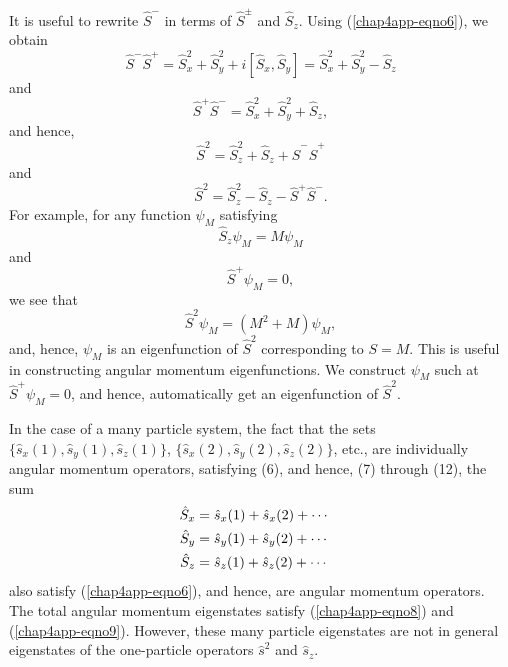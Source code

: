 {It is useful to rewrite ${\hat S}^-$ in terms of ${\hat S}^{\pm}$ and 
${\hat S}_z$. Using (\ref{chap4app-eqno6}), we obtain
\begin{equation}
{\hat S}^- {\hat S}^+ = {\hat S}^2_x + {\hat S}^2_y + i \left[ {\hat S}_x , 
{\hat S}_y \right] = {\hat S}^2_x + {\hat S}^2_y - {\hat S}_z
\end{equation}
and
\begin{equation}
{\hat S}^+ {\hat S}^- = {\hat S}^2_x + {\hat S}^2_y + {\hat S}_z ,
\end{equation}
and hence,
\begin{equation}
{\hat S}^2 = {\hat S}^2_z + {\hat S}_z + {\hat S}^- {\hat S}^+
\label{chap4app-eqno12a}
\end{equation}
and
\begin{equation}
{\hat S}^2 = {\hat S}^2_z - {\hat S}_z - {\hat S}^+ {\hat S}^- 
.
\label{chap4app-eqno12b}
\end{equation}
For example, for any function $\psi_M$ satisfying
\begin{equation}
{\hat S}_z \psi_M = M \psi_M
\end{equation}
and
\begin{equation}
{\hat S}^+ \psi_M = 0 ,
\end{equation}
we see that
\begin{equation}
{\hat S}^2 \psi_M = ( M^2 + M ) \psi_M ,
\end{equation}
and, hence, $\psi_M$ is an eigenfunction of ${\hat S}^2$ corresponding to 
$S = M$.  This is useful in constructing angular momentum eigenfunctions.  We 
construct $\psi_M$ such at ${\hat S}^+ \psi_M = 0$, and hence, automatically 
get an eigenfunction of ${\hat S}^2$.

In the case of a many particle system, the fact that the sets 
$\{ {\hat s}_x (1) , {\hat s}_y (1) , {\hat s}_z (1)\}$, 
$\{ {\hat s}_x (2) , {\hat s}_y (2) , {\hat s}_z (2)\}$,
etc., are individually angular momentum operators,
satisfying (6), and hence, (7) through (12), the sum
\begin{eqnarray}
{\hat S}_x &= {\hat s}_x (1) + {\hat s}_x (2) + \cdots\cr
{\hat S}_y &= {\hat s}_y (1) + {\hat s}_y (2) + \cdots\cr
{\hat S}_z &= {\hat s}_z (1) + {\hat s}_z (2) + \cdots
\end{eqnarray}
also satisfy (\ref{chap4app-eqno6}), and hence, are angular momentum
operators.  The total angular momentum eigenstates satisfy
(\ref{chap4app-eqno8}) and (\ref{chap4app-eqno9}).  However, these
many particle eigenstates are not in general eigenstates of the
one-particle operators ${\hat s}^2$ and ${\hat s}_z$.

}
